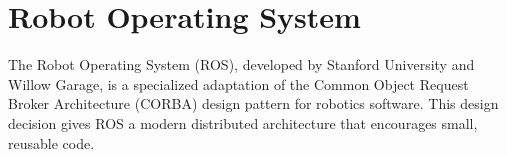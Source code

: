 % 
% 
% 
% 


\section{Robot Operating System}
The Robot Operating System (ROS), developed by Stanford University and Willow Garage, is a specialized adaptation of the Common Object Request Broker Architecture (CORBA) design pattern for robotics software. This design decision gives ROS a modern distributed architecture that encourages small, reusable code.

